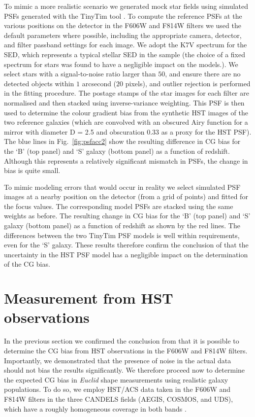 \documentclass[useAMS,usenatbib]{mnras}
\begin{document}
To mimic a more realistic scenario we generated mock star fields using simulated PSFs generated with
the {\sc TinyTim} tool \citep{2011SPIE.8127E..0JK}. To compute the reference PSFs at the various positions on the detector in the F606W and F814W filters we used the default parameters where possible, including the appropriate camera, detector, and filter passband settings for each image. We adopt the K7V spectrum for the SED, which represents a typical stellar SED in the sample (the choice of a fixed spectrum for stars was found to have a negligible impact on the models.). We select stars with a signal-to-noise ratio larger than $50$, and ensure there are no detected objects within $1$ arcsecond ($20$ pixels), and outlier rejection is performed in the fitting procedure. The postage stamps of the star images for each filter are normalised and then stacked using inverse-variance weighting. This PSF is then used to determine the colour gradient bias from the synthetic HST images of the two reference galaxies (which are convolved with an obscured Airy function for a mirror with diameter D = 2.5 and obscuration 0.33 as a proxy for the HST PSF). The blue lines in Fig.~\ref{fig:psfacc2} show the resulting difference in CG bias for the `B' (top panel) and `S' galaxy (bottom panel) as a function of redshift. Although this represents a relatively significant mismatch in PSFs, the change in bias is quite small.

To mimic modeling errors that would occur in reality we select simulated PSF images at a nearby position on the detector (from a grid of points) and fitted for the focus values. The corresponding model PSFs are stacked using the same weights as before. The resulting change in CG bias for the `B' (top panel) and `S' galaxy (bottom panel) as a function of redshift as shown by the red lines. The differences between the two TinyTim PSF models is well within requirements, even for the `S' galaxy. These results therefore confirm the
conclusion of   that the uncertainty in the HST PSF model has a negligible impact on the determination of the CG bias.

\section{Measurement from HST observations}
\label{sec:candels}

In the previous section we confirmed the conclusion from  
that it is possible to determine the CG bias from HST observations in the F606W 
and F814W filters. Importantly, we demonstrated that the presence of noise in the 
actual data should not bias the results significantly. We therefore proceed now to
determine the expected CG bias in {\it Euclid} shape measurements using
realistic galaxy populations. To do so, we employ HST/ACS data taken in the F606W and F814W
filters in the three CANDELS fields (AEGIS, COSMOS, and UDS), which have
a roughly homogeneous coverage in both bands \citep[see][]{davis2007,grogin2011,Koekemoer11}.
\end{document}
